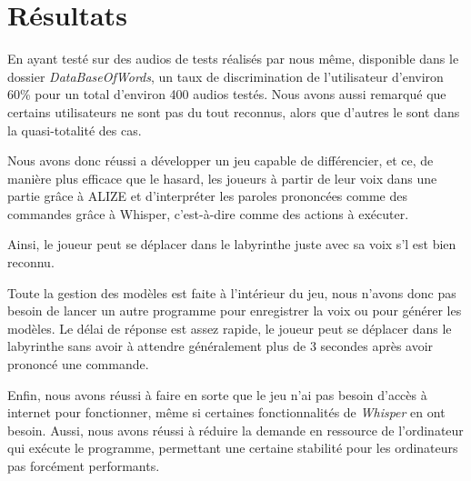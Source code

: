 \section{Résultats}
\label{sec:resultats}

En ayant testé sur des audios de tests réalisés par nous même, disponible dans le dossier \textit{DataBaseOfWords}, un taux de discrimination de l'utilisateur d'environ 60\% pour un total d'environ 400 audios testés. Nous avons aussi remarqué que certains utilisateurs ne sont pas du tout reconnus, alors que d'autres le sont dans la quasi-totalité des cas.

Nous avons donc réussi a développer un jeu capable de différencier, et ce, de manière plus efficace que le hasard, les joueurs à partir de leur voix dans une partie grâce à ALIZE et d'interpréter les paroles prononcées comme des commandes grâce à Whisper, c'est-à-dire comme des
actions à exécuter. 

Ainsi, le joueur peut se déplacer dans le labyrinthe juste avec sa voix s'l est bien reconnu. 

Toute la gestion des modèles est faite à l'intérieur du jeu, nous n'avons donc pas besoin de lancer un autre programme pour enregistrer la voix ou pour générer les modèles. 
Le délai de réponse est assez rapide, le joueur peut se déplacer dans le labyrinthe sans avoir à attendre généralement plus de 3 secondes après avoir prononcé une commande. 

Enfin, nous avons réussi à faire en sorte que le jeu n'ai pas besoin d'accès à internet pour fonctionner, même si certaines fonctionnalités de \textit{Whisper} en ont besoin.
Aussi, nous avons réussi à réduire la demande en ressource de l'ordinateur qui exécute le programme, permettant une certaine stabilité pour les ordinateurs pas forcément performants.
